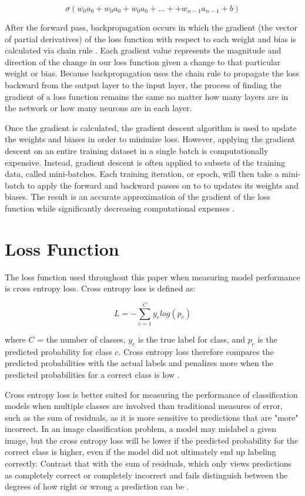 \documentclass [MAS] {uclathes}
\begin{document}
\[\sigma(w_0a_0 + w_0a_0 + w_0a_0 + ... + + w_{n-1}a_{n-1} + b)\]

After the forward pass, backpropagation occurs in which the gradient (the vector of partial derivatives) of the loss 
function with respect to each weight and bias is calculated via chain rule \cite{nn_analyze}. Each gradient value 
represents the magnitude and direction of the change in our loss function given a change to that particular weight or 
bias. Because backpropagation uses the chain rule to propagate the loss backward from the output layer to the input 
layer, the process of finding the gradient of a loss function remains the same no matter how many layers are in the 
network or how many neurons are in each layer.

Once the gradient is calculated, the gradient descent algorithm is used to update the weights and biases in order to 
minimize loss. However, applying the gradient descent on an entire training dataset in a single batch is computationally 
expensive. Instead, gradient descent is often applied to subsets of the training data, called mini-batches. Each 
training iteration, or epoch, will then take a mini-batch to apply the forward and backward passes on to to updates its 
weights and biases. The result is an accurate approximation of the gradient of the loss function while significantly 
decreasing computational expenses \cite{nn_backprop}.

\section{Loss Function}
The loss function used throughout this paper when measuring model performance is cross entropy loss. Cross entropy loss 
is defined as:

\[L = -\sum_{c=1}^{C}y_{c}log(p_{c})\]

where \(C\) = the number of classes, \(y_{c}\) is the true label for class, and \(p_{c}\) is the predicted probability 
for class \(c\). Cross entropy loss therefore compares the predicted probabilities with the actual labels and penalizes 
more when the predicted probabilities for a correct class is low \cite{cross_entropy_intro}.

Cross entropy loss is better suited for measuring the performance of classification models when multiple classes are 
involved than traditional measures of error, such as the sum of residuals, as it is more sensitive to predictions that 
are "more" incorrect. In an image classification problem, a model may mislabel a given image, but the cross entropy loss 
will be lower if the predicted probability for the correct class is higher, even if the model did not ultimately end up 
labeling correctly. Contrast that with the sum of residuals, which only views predictions as completely correct or 
completely incorrect and fails distinguish between the degrees of how right or wrong a prediction can be \cite{cross_entropy_lecture}.
\end{document}
